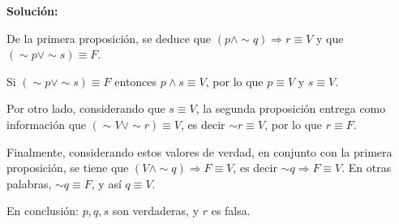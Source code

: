 \documentclass[a4paper,10pt]{article}
\begin{document}
\textbf{Solución:}

    De la primera proposición, se deduce que $(p \wedge \sim q) \Rightarrow r \equiv V$ y que $(\sim p \vee \sim s) \equiv F$.

    Si $(\sim p \vee \sim s) \equiv F$ entonces $p \wedge s \equiv V$, por lo que $p\equiv V$ y $s\equiv V$.

    Por otro lado, considerando que $s \equiv V$, la segunda proposición entrega como información que $(\sim V \vee \sim r) \equiv V$, es decir $\sim r \equiv V$, por lo que $r \equiv F$.

    Finalmente, considerando estos valores de verdad, en conjunto con la primera proposición, se tiene que $(V \wedge \sim q) \Rightarrow F \equiv V$, es decir $\sim q \Rightarrow F \equiv V$. En otras palabras, $\sim q \equiv F$, y así $q \equiv V$.

    En conclusión: $p,q,s$ son verdaderas, y $r$ es falsa.
\end{document}
